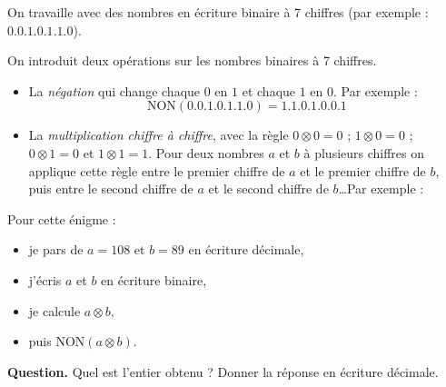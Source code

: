 \documentclass[class=report,crop=false, 12pt]{standalone}
\begin{document}


\begin{enigme}[Binaire]

On travaille avec des nombres en écriture binaire à 7 chiffres (par exemple :
$0.0.1.0.1.1.0$).

On introduit deux opérations sur les nombres binaires à 7 chiffres.
\begin{itemize}
  \item La \emph{négation} qui change chaque $0$ en $1$ et chaque $1$ en $0$.
  Par exemple :
  $$\text{NON}(0.0.1.0.1.1.0) = 1.1.0.1.0.0.1$$

 \item La \emph{multiplication chiffre à chiffre}, avec la règle
 $0 \otimes 0 = 0$ ; $1 \otimes 0 = 0$ ; $0 \otimes 1 = 0$ et $1 \otimes 1 = 1$.
 Pour deux nombres $a$ et $b$ à plusieurs chiffres on applique cette règle entre le premier chiffre de $a$ et le premier chiffre de $b$, puis entre le second chiffre de $a$ et le second chiffre de $b$\ldots Par exemple :
 
\end{itemize}

\bigskip

Pour cette énigme : 
\begin{itemize}
  \item je pars de $a= 108$ et $b=89$ en écriture décimale,
  \item j'écris $a$ et $b$ en écriture binaire,
  \item je calcule $a \otimes b$,
  \item puis $\text{NON}(a\otimes b)$.
\end{itemize}
 
\bigskip

\textbf{Question.} Quel est l'entier obtenu ? Donner la réponse en écriture décimale.


\end{enigme}
\end{document}
